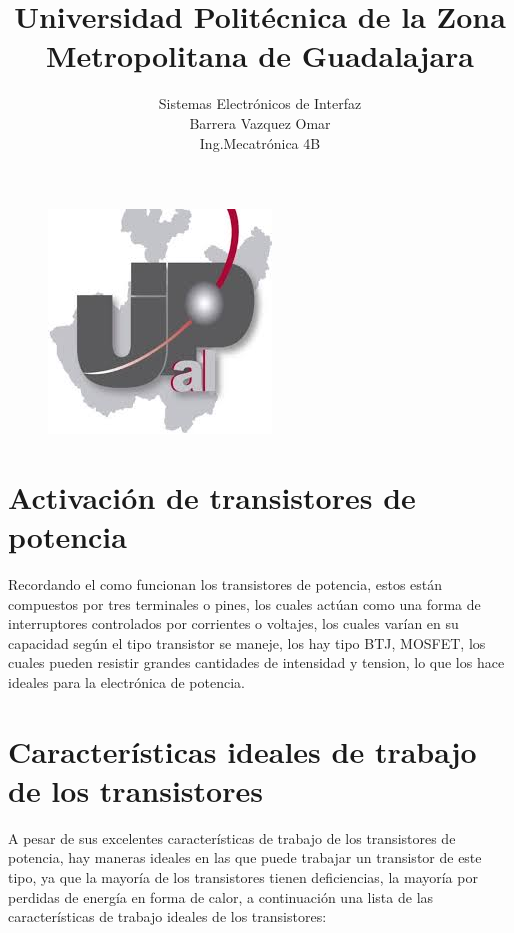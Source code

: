 \documentclass[11pt,a4paper]{article}
\title{Universidad Politécnica de la Zona Metropolitana de Guadalajara}
\begin{document}
\maketitle
\begin{figure}[h]
\begin{center}
\includegraphics[scale=1]{1.jpeg}
\end{center}
\end{figure}

\begin{center}
\author{Sistemas Electrónicos de Interfaz\\
Barrera Vazquez Omar\\
Ing.Mecatrónica 4B}
\end{center}

\newpage


\section{Activación de transistores de potencia}

Recordando el como funcionan los transistores de potencia, estos están compuestos por tres terminales o pines, los cuales actúan como una forma de interruptores controlados por corrientes o voltajes, los cuales varían en su capacidad según el tipo transistor se maneje, los hay tipo BTJ, MOSFET, los cuales pueden resistir grandes cantidades de intensidad y tension, lo que los hace ideales para la electrónica de potencia.

\section{Características ideales de trabajo de los transistores}

A pesar de sus excelentes características de trabajo de los transistores de potencia, hay maneras ideales en las que puede trabajar un transistor de este tipo, ya que la mayoría de los transistores tienen deficiencias, la mayoría por perdidas de energía en forma de calor, a continuación una lista de las características de trabajo ideales de los transistores:
\end{document}
